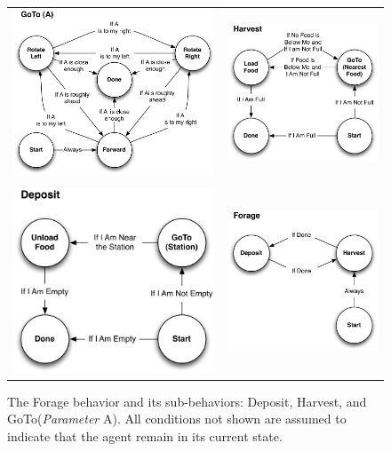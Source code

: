 \begin{figure}[t]
\begin{center}
\noindent\begin{tabular}{cc}
\includegraphics[width=3.5in]{GoTo.pdf}&
\includegraphics[width=2.6in]{Harvest.pdf}\\
\\
\includegraphics[width=2.6in]{Deposit.pdf}&
\includegraphics[width=2.6in]{Forage.pdf}\\
\end{tabular}
\end{center}
\caption{The Forage behavior and its sub-behaviors: Deposit, Harvest, and GoTo(\textit{Parameter} A).  All conditions not shown are assumed to indicate that the agent remain in its current state.}
\label{foraging}
\end{figure}
